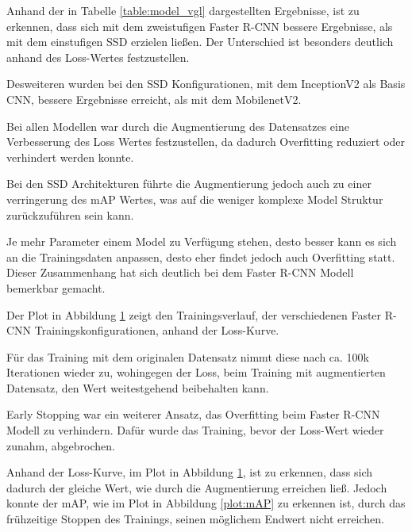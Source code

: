 Anhand der in Tabelle \ref{table:model_vgl} dargestellten 
Ergebnisse, ist zu erkennen, dass sich mit dem zweistufigen 
Faster R-CNN bessere Ergebnisse, als mit dem einstufigen
SSD erzielen ließen.
Der Unterschied ist besonders deutlich anhand des Loss-Wertes 
festzustellen.

Desweiteren wurden bei den SSD Konfigurationen, mit dem InceptionV2 
als Basis CNN, bessere Ergebnisse erreicht, als mit dem 
MobilenetV2.

Bei allen Modellen war durch die Augmentierung des 
Datensatzes eine Verbesserung des Loss Wertes festzustellen, 
da dadurch Overfitting reduziert oder verhindert werden konnte.

Bei den  SSD Architekturen führte die Augmentierung
jedoch auch zu einer verringerung des mAP Wertes, 
was auf die weniger komplexe Model Struktur zurückzuführen sein kann.

Je mehr Parameter einem Model zu Verfügung stehen, desto besser kann 
es sich an die Trainingsdaten anpassen, desto eher findet jedoch
auch Overfitting statt.
Dieser Zusammenhang hat sich deutlich bei dem Faster R-CNN 
Modell bemerkbar gemacht.

Der Plot in Abbildung \ref{plot:loss} zeigt den Trainingsverlauf, 
der verschiedenen Faster R-CNN
Trainingskonfigurationen, anhand der Loss-Kurve.

Für das Training mit dem originalen Datensatz nimmt diese nach ca.
100k Iterationen wieder zu, wohingegen der Loss, beim Training 
mit augmentierten Datensatz, den Wert weitestgehend beibehalten 
kann.

Early Stopping war ein weiterer Ansatz, das 
Overfitting beim Faster R-CNN Modell zu verhindern.
Dafür wurde das Training, bevor der Loss-Wert 
wieder zunahm, abgebrochen.

Anhand der Loss-Kurve, im Plot in Abbildung \ref{plot:loss}, 
ist zu erkennen, dass sich dadurch der gleiche
Wert, wie durch die Augmentierung erreichen ließ.
Jedoch konnte der mAP, wie im Plot in Abbildung \ref{plot:mAP}
zu erkennen ist, durch das frühzeitige Stoppen des 
Trainings, seinen möglichem Endwert nicht erreichen.


\vspace{0.5cm}
\begin{figure}[H]
\begin{minipage}{0.5\textwidth}
  \centering
  \def\svgwidth{0.95\textwidth}
  
  \label{plot:mAP}
\end{minipage}
\begin{minipage}{0.5\textwidth}
  \centering
  \def\svgwidth{0.95\textwidth}
  
  \label{plot:loss}
\end{minipage}
\end{figure}

